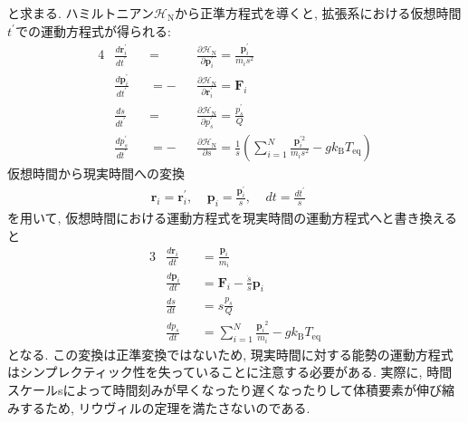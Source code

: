 と求まる.
ハミルトニアン$\mathcal{H}_{\mathrm{N}}$から正準方程式を導くと, 拡張系における仮想時間$t^{\prime}$での運動方程式が得られる:
\begin{alignat}{4}
 &\frac{d \bm{r}^{\prime}_{i}}{d t^{\prime}}
 &&= &&\frac{\partial \mathcal{H}_{\mathrm{N}}}{\partial \bm{p}^{\prime}_{i}}
   = \frac{\bm{p}^{\prime}_{i}}{m_{i} s^{2}}
 \label{eq:NoseHoover9.1}
 \\
 &\frac{d \bm{p}^{\prime}_{i}}{d t^{\prime}}
 &&= - &&\frac{\partial \mathcal{H}_{\mathrm{N}}}{\partial \bm{r}^{\prime}_{i}}
   = \bm{F}_{i}
 \label{eq:NoseHoover9.2}
 \\
 &\frac{d s}{d t^{\prime}}
  &&= &&\frac{\partial \mathcal{H}_{\mathrm{N}}}{\partial p^{\prime}_{s}}
    = \frac{p^{\prime}_{s}}{Q}
 \label{eq:NoseHoover9.3}
 \\
 &\frac{d p^{\prime}_{s}}{d t^{\prime}}
 &&= - &&\frac{\partial \mathcal{H}_{\mathrm{N}}}{\partial s}
   = \frac{1}{s}
     \left(
           \sum_{i=1}^{N} \frac{{\bm{p}_{i}^{\prime 2}}}{m_{i} s^{2}}
            -g k_{\mathrm{B}} T_{\mathrm{eq}}
     \right)
 \label{eq:NoseHoover9.4}
\end{alignat}
仮想時間から現実時間への変換
\begin{align}
 \bm{r}_{i} = \bm{r}^{\prime}_{i},~~~~~
 \bm{p}_{i} = \frac{\bm{p}^{\prime}_{i}}{s},~~~~~
 dt         = \frac{dt^{\prime}}{s}~~~~~
\end{align}
を用いて, 仮想時間における運動方程式を現実時間の運動方程式へと書き換えると
\begin{alignat}{3}
 &
 \frac{d \bm{r}_{i}}{d t} &&=
 \frac{\bm{p}_{i}}{m_{i} }
 \label{eq:NoseHoover10.1}
 \\
 &
 \frac{d \bm{p}_{i}}{d t} &&=
 \bm{F}_{i} - \frac{\dot{s}}{s} \bm{p}_{i}
 \label{eq:NoseHoover10.2}
 \\
 &
 \frac{d s}{d t} &&=
 s \frac{p_{s}}{Q}
 \label{eq:NoseHoover10.3}
 \\
 &
 \frac{d p_{s}}{d t} &&=
 \sum_{i=1}^{N} \frac{{\bm{p}_{i}}^{2}}{m_{i}} -g k_{\mathrm{B}} T_{\mathrm{eq}}
 \label{eq:NoseHoover10.4}
\end{alignat}
となる.
この変換は正準変換ではないため, 現実時間に対する能勢の運動方程式はシンプレクティック性を失っていることに注意する必要がある.
実際に, 時間スケールsによって時間刻みが早くなったり遅くなったりして体積要素が伸び縮みするため, リウヴィルの定理を満たさないのである.

